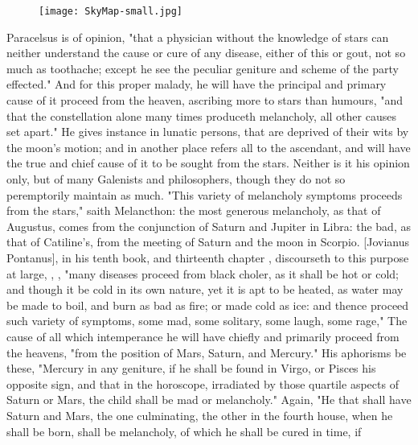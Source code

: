 \begin{figure}[p]
  \begingroup
  \centering
  \texttt{[image: SkyMap-small.jpg]}
  \label{fig:skymap}
\end{figure}

Paracelsus is of opinion, "that a physician without the
knowledge of stars can neither understand the cause or cure of any disease,
either of this or gout, not so much as toothache; except he see the peculiar
geniture and scheme of the party effected." And for this proper malady, he will
have the principal and primary cause of it proceed from the heaven, ascribing
more to stars than humours, "and that the constellation
alone many times produceth melancholy, all other causes set apart." He gives
instance in lunatic persons, that are deprived of their wits by the moon's
motion; and in another place refers all to the ascendant, and will have the
true and chief cause of it to be sought from the stars. Neither is it his
opinion only, but of many Galenists and philosophers, though they do not so
peremptorily maintain as much. "This variety of melancholy symptoms proceeds
from the stars," saith Melancthon: the most generous
melancholy, as that of Augustus, comes from the conjunction of Saturn and
Jupiter in Libra: the bad, as that of Catiline's, from the meeting of Saturn
and the moon in Scorpio. [Jovianus Pontanus], in his tenth book, and thirteenth
chapter , discourseth to this purpose at large, , \etc{}, "many diseases
proceed from black choler, as it shall be hot or cold; and though it be cold in
its own nature, yet it is apt to be heated, as water may be made to boil, and
burn as bad as fire; or made cold as ice: and thence proceed such variety of
symptoms, some mad, some solitary, some laugh, some rage," \etc{} The cause of
all which intemperance he will have chiefly and primarily proceed from the
heavens, "from the position of Mars, Saturn, and Mercury."
His aphorisms be these, "Mercury in any geniture, if he
shall be found in Virgo, or Pisces his opposite sign, and that in the
horoscope, irradiated by those quartile aspects of Saturn or Mars, the child
shall be mad or melancholy." Again, "He that shall have
Saturn and Mars, the one culminating, the other in the fourth house, when he
shall be born, shall be melancholy, of which he shall be cured in time, if
